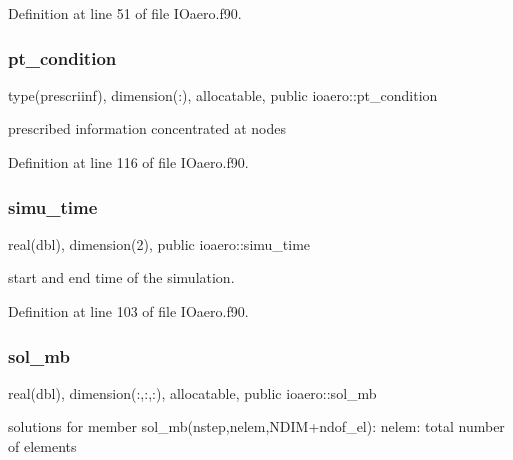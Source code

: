 Definition at line 51 of file I\+Oaero.\+f90.

\mbox{\label{namespaceioaero_a4344b2018135ae7fe0a09f4265fd2c29}} 
\subsubsection{\texorpdfstring{pt\+\_\+condition}{pt\_condition}}
{\footnotesize\ttfamily type(prescriinf), dimension(\+:), allocatable, public ioaero\+::pt\+\_\+condition}



prescribed information concentrated at nodes 



Definition at line 116 of file I\+Oaero.\+f90.

\mbox{\label{namespaceioaero_ab6c271c9ebbeb9a315ec53d38facb60b}} 
\subsubsection{\texorpdfstring{simu\+\_\+time}{simu\_time}}
{\footnotesize\ttfamily real(dbl), dimension(2), public ioaero\+::simu\+\_\+time}



start and end time of the simulation. 



Definition at line 103 of file I\+Oaero.\+f90.

\mbox{\label{namespaceioaero_a4933d28025772ee22892dc12780a8eef}} 
\subsubsection{\texorpdfstring{sol\+\_\+mb}{sol\_mb}}
{\footnotesize\ttfamily real(dbl), dimension(\+:,\+:,\+:), allocatable, public ioaero\+::sol\+\_\+mb}



solutions for member sol\+\_\+mb(nstep,nelem,N\+D\+I\+M+ndof\+\_\+el)\+: nelem\+: total number of elements 



